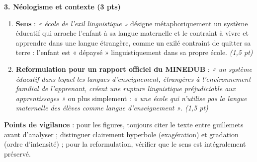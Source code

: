 \documentclass[11pt]{article}
\begin{document}
\begin{corrige}
\textbf{3. Néologisme et contexte (3 pts)}
\begin{enumerate}
    \item \textbf{Sens} : \emph{« école de l'exil linguistique »} désigne métaphoriquement un système éducatif qui arrache l'enfant à sa langue maternelle et le contraint à vivre et apprendre dans une langue étrangère, comme un exilé contraint de quitter sa terre : l'enfant est « dépaysé » linguistiquement dans sa propre école. \textit{(1,5 pt)}
    \item \textbf{Reformulation pour un rapport officiel du MINEDUB} : \emph{« un système éducatif dans lequel les langues d'enseignement, étrangères à l'environnement familial de l'apprenant, créent une rupture linguistique préjudiciable aux apprentissages »} ou plus simplement : \emph{« une école qui n'utilise pas la langue maternelle des élèves comme langue d'enseignement »}. \textit{(1,5 pt)}
\end{enumerate}
\textbf{Points de vigilance} : pour les figures, toujours citer le texte entre guillemets avant d'analyser ; distinguer clairement hyperbole (exagération) et gradation (ordre d'intensité) ; pour la reformulation, vérifier que le sens est intégralement préservé.
\end{corrige}
\end{document}
